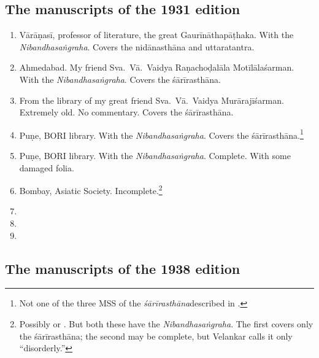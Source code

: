 \documentclass[12pt]{article}
\begin{document}
        \subsection{The manuscripts of the 1931 edition}

\begin{enumerate}

    \item[1] Vārāṇasī, professor of literature, the great Gaurīnāthapāṭhaka.  With the 
    \emph{Nibandhasaṅgraha}. Covers the nidānasthāna and uttaratantra.
    
    \item [2]  Ahmedabad.  My friend Sva.\ Vā.\ Vaidya Raṇachoḍalāla Motīlālaśarman.  
    With the \emph{Nibandhasaṅgraha}.  Covers the śārīrasthāna.
    
    \item [3] From the library of my great friend Sva.\ Vā.\ Vaidya Murārajīśarman.  
    Extremely old. No commentary.  Covers the śārīrasthāna. 
    
    \item [4]  Puṇe, BORI library.  With the \emph{Nibandhasaṅgraha}. Covers the
śārīrasthāna.\footnote{Not one of the three MSS of the
\emph{śārīrasthāna}described in \cite{shar-vaid}.}
    
    \item [5]  Puṇe, BORI library.  With the \emph{Nibandhasaṅgraha}. Complete.  
    With some damaged folia.
    
    \item [6]  Bombay, Asiatic Society.  Incomplete.\footnote{Possibly  or  \citep[v.\,1, \# 212 and 
    213]{vela-1930}.  But both these have the \emph{Nibandhasaṅgraha}.  The first 
    covers only the śārīrasthāna; the second may be complete, but Velankar calls it 
    only “disorderly.”}
    
    \item [7] 
    
    \item [8]
    
    \item [9]

\end{enumerate}
    
        \subsection{The manuscripts of the 1938 edition}
        
\end{document}

